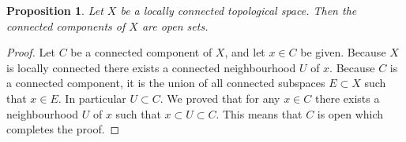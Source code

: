\documentclass[11pt,a4paper]{article}
\theoremstyle{definition}
\theoremstyle{plain}
\newtheorem{proposition}[theorem]{Proposition}
\begin{document}
  \begin{proposition}
    Let $X$ be a locally connected topological space.
    Then the connected components of $X$ are open sets.
  \end{proposition}
  \begin{proof}
    Let $C$ be a connected component of $X$, and let $x \in C$ be given.
    Because $X$ is locally connected there exists a connected neighbourhood
    $U$ of $x$.
    Because $C$ is a connected component, it is the union of all connected
    subspaces $E \subset X$ such that $x \in E$.
    In particular $U \subset C$.
    We proved that for any $x \in C$ there exists a neighbourhood $U$ of
    $x$ such that $x \subset U \subset C$.
    This means that $C$ is open which completes the proof.
  \end{proof}

  
  
\end{document}
